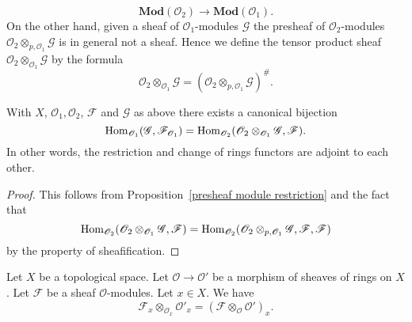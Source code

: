\[\mathbf{Mod}(\mathscr{O}_2)\to\mathbf{Mod}(\mathscr{O}_1).\]
On the other hand, given a sheaf of $\mathscr{O}_1$-modules $\mathscr{G}$ the presheaf of $\mathscr{O}_2$-modules $\mathscr{O}_2\otimes_{p,\mathscr{O}_1}\mathscr{G}$ is in general not a sheaf. Hence we define the tensor product sheaf $\mathscr{O}_2\otimes_{\mathscr{O}_1}\mathscr{G}$ by the formula
\[\mathscr{O}_2\otimes_{\mathscr{O}_1}\mathscr{G}=(\mathscr{O}_2\otimes_{p,\mathscr{O}_1}\mathscr{G})^{\#}.\]
\begin{proposition}\label{sheaf module restrict adj}
With $X$, $\mathscr{O}_1,\mathscr{O}_2$, $\mathscr{F}$ and $\mathscr{G}$ as above there exists a canonical bijection
\[\mathrm{Hom}_{\mathscr{O}_1}(\mathscr{G},\mathscr{F}_{\mathscr{O}_1})=\mathrm{Hom}_{\mathscr{O}_2}(\mathscr{O}_2\otimes_{\mathscr{O}_1}\mathscr{G},\mathscr{F}).\]
In other words, the restriction and change of rings functors are adjoint to each other.
\end{proposition}
\begin{proof}
This follows from Proposition~\ref{presheaf module restriction} and the fact that \[\mathrm{Hom}_{\mathscr{O}_2}(\mathscr{O}_2\otimes_{\mathscr{O}_1}\mathscr{G},\mathscr{F})=\mathrm{Hom}_{\mathscr{O}_2}(\mathscr{O}_2\otimes_{p,\mathscr{O}_1}\mathscr{G},\mathscr{F},\mathscr{F})\]
by the property of sheafification.
\end{proof}
\begin{proposition}\label{ext module stalk}
Let $X$ be a topological space. Let $\mathscr{O}\to\mathscr{O}'$ be a morphism of sheaves of rings on $X$. Let $\mathscr{F}$ be a sheaf $\mathscr{O}$-modules. Let $x\in X$. We have
\[\mathscr{F}_x\otimes_{\mathscr{O}_x}\mathscr{O}'_x=(\mathscr{F}\otimes_{\mathscr{O}}\mathscr{O}')_x.\]
\end{proposition}
